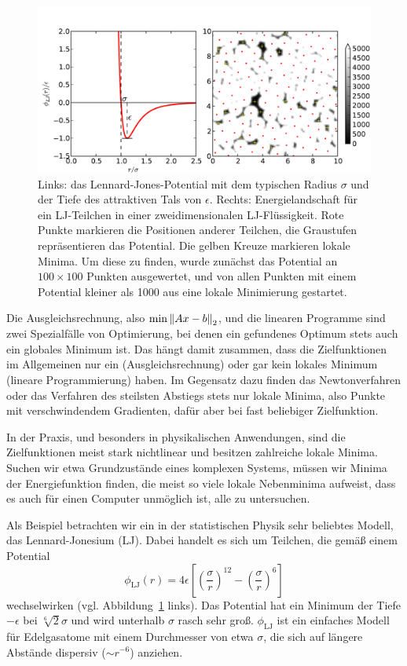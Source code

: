 \begin{figure}
  \centering
  \includegraphics[width=\textwidth]{plots/lj}
  \caption{Links: das Lennard-Jones-Potential mit dem typischen Radius
    $\sigma$ und der Tiefe des attraktiven Tals von
    $\epsilon$. Rechts: Energielandschaft für ein LJ-Teilchen in einer
    zweidimensionalen LJ-Flüssigkeit. Rote Punkte markieren die
    Positionen anderer Teilchen, die Graustufen repräsentieren das
    Potential. Die gelben Kreuze markieren lokale Minima. Um diese zu
    finden, wurde zunächst das Potential an $100\times 100$ Punkten
    ausgewertet, und von allen Punkten mit einem Potential kleiner als
    1000 aus eine lokale Minimierung gestartet.}
  \label{fig:ljminima}
\end{figure}

Die Ausgleichsrechnung, also $\min \left\lVert{Ax-b}\right\rVert_2$, und die linearen
Programme sind zwei Spezialfälle von Optimierung, bei denen ein
gefundenes Optimum stets auch ein globales Minimum ist. Das hängt
damit zusammen, dass die Zielfunktionen im Allgemeinen nur ein
(Ausgleichsrechnung) oder gar kein lokales Minimum (lineare
Programmierung) haben. Im Gegensatz dazu finden das Newtonverfahren
oder das Verfahren des steilsten Abstiegs stets nur lokale Minima,
also Punkte mit verschwindendem Gradienten, dafür aber bei fast
beliebiger Zielfunktion.

In der Praxis, und besonders in physikalischen Anwendungen, sind die
Zielfunktionen meist stark nichtlinear und besitzen zahlreiche lokale
Minima. Suchen wir etwa Grundzustände eines komplexen Systems, müssen
wir Minima der Energiefunktion finden, die meist so viele lokale
Nebenminima aufweist, dass es auch für einen Computer unmöglich ist,
alle zu untersuchen.

Als Beispiel betrachten wir ein in der statistischen Physik sehr
beliebtes Modell, das Lennard-Jonesium (LJ). Dabei handelt es sich um
Teilchen, die gemäß einem Potential
\begin{equation}
  \phi_{\text{LJ}}(r) = 4\epsilon\left[\left(\frac{\sigma}{r}\right)^{12} -
    \left(\frac{\sigma}{r}\right)^{6}\right]
\end{equation}
wechselwirken (vgl. Abbildung~\ref{fig:ljminima} links). Das Potential
hat ein Minimum der Tiefe $-\epsilon$ bei $\sqrt[6]{2}\sigma$ und wird
unterhalb $\sigma$ rasch sehr groß. $\phi_{\text{LJ}}$ ist ein
einfaches Modell für Edelgasatome mit einem Durchmesser von etwa
$\sigma$, die sich auf längere Abstände dispersiv ($\sim r^{-6}$)
anziehen.

